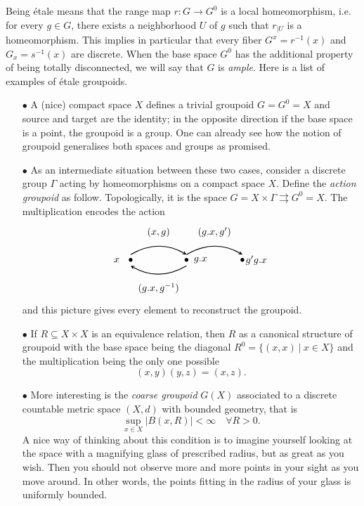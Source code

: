 Being étale means that the range map $r: G \rightarrow G^0$ is a local homeomorphism, i.e. for every $g\in G$, there exists a neighborhood $U$ of $g$ such that $r_{|U}$ is a homeomorphism. This implies in particular that every fiber $G^x = r^{-1}(x)$ and $G_x = s^{-1}(x)$ are discrete. When the base space $G^0$ has the additional property of being totally disconnected, we will say that $G$ is \textit{ample}. Here is a list of examples of étale groupoids.\\

\begin{itemize}
\item[$\bullet$] A (nice) compact space $X$ defines a trivial groupoid $G=G^0=X$ and source and target are the identity; in the opposite direction if the base space is a point, the groupoid is a group. One can already see how the notion of groupoid generalises both spaces and groups as promised.  \\

\item[$\bullet$] As an intermediate situation between these two cases, consider a discrete group $\Gamma$ acting by homeomorphisms on a compact space $X$. Define the \textit{action groupoid} as follow. Topologically, it is the space $G= X\times \Gamma \rightrightarrows G^0 = X$. The multiplication encodes the action
\[\begin{tikzpicture}
\draw  (0,1) node {$(x,g)$};
\draw  (0,-1) node {$(g.x,g^{-1})$};
\draw  (2,1) node {$(g.x,g')$};
\draw [>=stealth, ->, thick] (-1,0.2) to[bend left] (1,0.2);
\draw [>=stealth, ->,thick] (1,-0.2) to[bend left] (-1,-0.2);
\draw [>=stealth, ->, thick] (1,0.2) to[bend left] (3,0.2);
\draw  (-1,0) node {$\bullet$};
\draw  (-1.5,0) node {$x$};
\draw  (1,0) node {$\bullet$};
\draw  (1.5,0) node {$g.x$};
\draw  (3,0) node {$\bullet$};
\draw  (3.5,0) node {$g'g.x$};
\end{tikzpicture}\]
and this picture gives every element to reconstruct the groupoid.\\

\item[$\bullet$] If $R\subseteq X\times X $ is an equivalence relation, then $R$ as a canonical structure of groupoid with the base space being the diagonal $R^0 = \{ (x,x) \ | \ x\in X\}$ and the multiplication being the only one possible
\[(x,y)(y,z) = (x,z).\] 

\item[$\bullet$] More interesting is the \textit{coarse groupoid} $G(X)$ associated to a discrete countable metric space $(X,d)$ with bounded geometry, that is
\[\sup_{x\in X} |B(x,R)| < \infty \quad \forall R>0.\]
A nice way of thinking about this condition is to imagine yourself looking at the space with a magnifying glass of prescribed radius, but as great as you wish. Then you should not observe more and more points in your sight as you move around. In other words, the points fitting in the radius of your glass is uniformly bounded.\\


\end{itemize}
